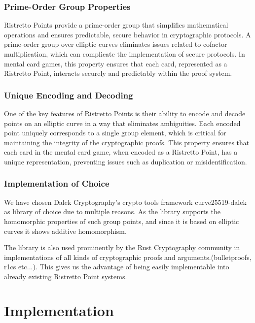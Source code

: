 \documentclass[12pt,a4paper]{report}
\begin{document}
\subsection*{Prime-Order Group Properties}
Ristretto Points provide a prime-order group that simplifies 
mathematical operations and ensures predictable, 
secure behavior in cryptographic protocols.
A prime-order group over elliptic curves eliminates issues related to cofactor multiplication, which can complicate the implementation of secure protocols.
In mental card games, this property ensures that each card, represented as a Ristretto Point, interacts securely and predictably within the proof system.

\subsection*{Unique Encoding and Decoding}
One of the key features of Ristretto Points is their ability to encode and decode points on an elliptic curve in a way that eliminates ambiguities.
Each encoded point uniquely corresponds to a single group element, which is critical for maintaining the integrity of the cryptographic proofs.
This property ensures that each card in the mental card game, when encoded as a Ristretto Point, has a unique representation, preventing issues such as duplication or misidentification.

\subsection*{Implementation of Choice}
We have chosen Dalek Cryptography's crypto tools framework curve25519-dalek \cite{dalek:curve}
as library of choice due to multiple reasons.
As the library supports the homomorphic properties of such group points, and since it is based on elliptic curves it shows additive homomorphism.\par
The library is also used prominently by the Rust Cryptography community in 
implementations of all kinds of cryptographic proofs and arguments.(bulletproofs, r1cs etc...). This gives us the advantage of being easily implementable into already existing Ristretto Point systems.


\chapter{Implementation}
\end{document}
